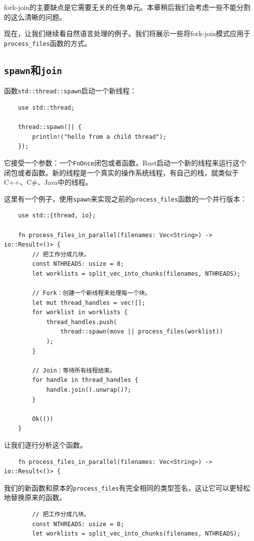fork-join的主要缺点是它需要无关的任务单元。本章稍后我们会考虑一些不能分割的这么清晰的问题。

现在，让我们继续看自然语言处理的例子。我们将展示一些将fork-join模式应用于\texttt{process\_files}函数的方式。

\subsection{\texttt{spawn}和\texttt{join}}\label{spawn}
函数\texttt{std::thread::spawn}启动一个新线程：
\begin{verbatim}
    use std::thread;

    thread::spawn(|| {
        println!("hello from a child thread");
    });
\end{verbatim}

它接受一个参数：一个\texttt{FnOnce}闭包或者函数。Rust启动一个新的线程来运行这个闭包或者函数。新的线程是一个真实的操作系统线程，有自己的栈，就类似于C++、C\#、Java中的线程。

这里有一个例子，使用\texttt{spawn}来实现之前的\texttt{process\_files}函数的一个并行版本：
\begin{verbatim}
    use std::{thread, io};

    fn process_files_in_parallel(filenames: Vec<String>) -> io::Result<()> {
        // 把工作分成几块。
        const NTHREADS: usize = 8;
        let worklists = split_vec_into_chunks(filenames, NTHREADS);

        // Fork：创建一个新线程来处理每一个块。
        let mut thread_handles = vec![];
        for worklist in worklists {
            thread_handles.push(
                thread::spawn(move || process_files(worklist))
            );
        }

        // Join：等待所有线程结束。
        for handle in thread_handles {
            handle.join().unwrap()?;
        }

        Ok(())
    }
\end{verbatim}

让我们逐行分析这个函数。
\begin{verbatim}
    fn process_files_in_parallel(filenames: Vec<String>) -> io::Result<()> {
\end{verbatim}

我们的新函数和原本的\texttt{process\_files}有完全相同的类型签名，这让它可以更轻松地替换原来的函数。

\begin{verbatim}
        // 把工作分成几块。
        const NTHREADS: usize = 8;
        let worklists = split_vec_into_chunks(filenames, NTHREADS);
\end{verbatim}

